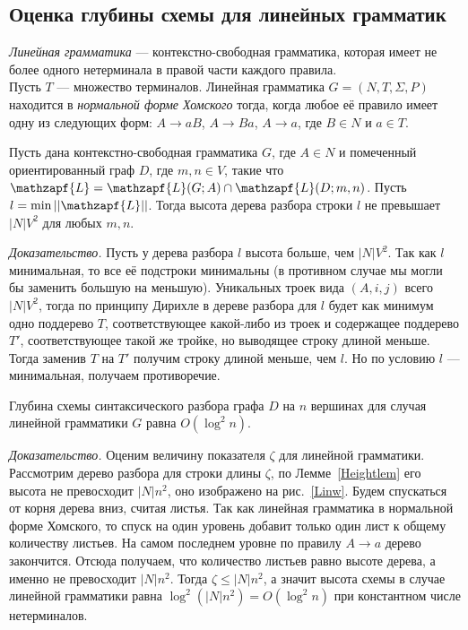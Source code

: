 \documentclass{spbau-diploma}
\begin{document}
\subsection{Оценка глубины схемы для линейных грамматик}
\textit{Линейная грамматика} --- контекстно-свободная грамматика, которая имеет не более одного нетерминала в правой части каждого правила. 
\\Пусть $T$ --- множество терминалов. Линейная грамматика $G = (N, T, \Sigma, P)$ находится в \textit{нормальной форме Хомского} тогда, когда любое её правило имеет  одну из следующих форм: $A \rightarrow aB$, $A \rightarrow Ba$, $A \rightarrow a$, где $B \in N$ и $a \in T$.
\begin{lemmarus}\label{Heightlem} Пусть дана контекстно-свободная грамматика $G$, где $A \in N$  и помеченный ориентированный граф $D$, где $m, n \in V$, такие что  $\mathzapf{L} = \mathzapf{L}(G; A) \cap  \mathzapf{L}(D; m, n)$. Пусть $l = \min ||\mathzapf{L}||$. Тогда высота дерева разбора строки  $l$ не превышает $|N|V^2$ для любых  $m, n$. 
\end{lemmarus}
\textit{Доказательство.} Пусть у дерева разбора $l$ высота больше, чем $|N|V^2$. Так как $l$ минимальная, то все её подстроки минимальны (в противном случае мы могли бы заменить большую на меньшую). Уникальных троек вида $(A, i, j)$ всего $|N|V^2$, тогда по принципу Дирихле в дереве разбора для $l$ будет как минимум одно поддерево $T$, соответствующее какой-либо из троек  и  содержащее поддерево $T'$, соответствующее такой же тройке, но выводящее строку длиной меньше. Тогда заменив  $T$ на $T'$ получим строку длиной меньше, чем $l$. Но по условию $l$ --- минимальная, получаем противоречие. 
\begin{theoremrus} 
Глубина схемы синтаксического разбора графа $D$ на $n$ вершинах для случая линейной грамматики $G$ равна $O(\log^2 n)$.
\end{theoremrus}

\textit{Доказательство.} Оценим величину показателя $\zeta$ для линейной грамматики. Рассмотрим дерево разбора для строки длины $\zeta$, по Лемме~\ref{Heightlem} его высота не превосходит $|N|n^2$, оно изображено на рис.~\ref{Linw}. Будем спускаться от корня дерева вниз, считая листья. Так как линейная грамматика в нормальной форме Хомского, то спуск на один уровень добавит только один лист к общему количеству листьев. На самом последнем уровне по правилу $A \rightarrow a$ дерево закончится. Отсюда получаем, что количество листьев равно высоте дерева, а именно не превосходит $|N|n^2$. Тогда  $\zeta \le |N|n^2$, а значит высота схемы в случае линейной грамматики равна $\log^2(|N|n^2) = O(\log^2 n)$ при константном числе нетерминалов. 
\end{document}
